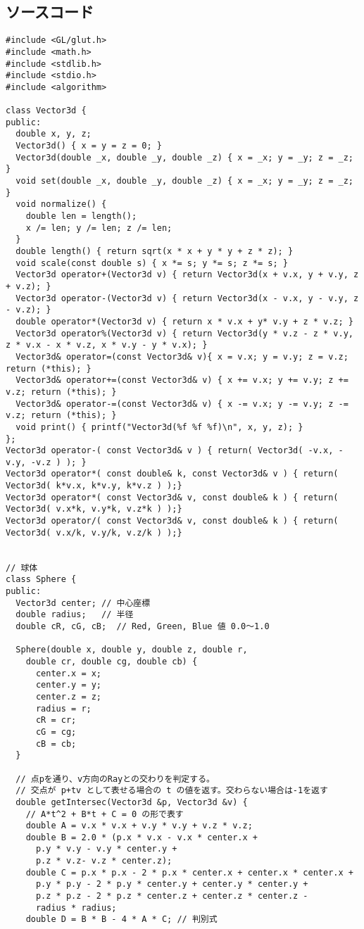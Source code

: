 \documentclass{scrartcl}
\begin{document}
\subsection{ソースコード}
\label{sec:org86d9aa2}
\begin{verbatim}
#include <GL/glut.h>
#include <math.h>
#include <stdlib.h>
#include <stdio.h>
#include <algorithm>

class Vector3d {
public:
  double x, y, z;
  Vector3d() { x = y = z = 0; }
  Vector3d(double _x, double _y, double _z) { x = _x; y = _y; z = _z; }
  void set(double _x, double _y, double _z) { x = _x; y = _y; z = _z; }
  void normalize() {
    double len = length();
    x /= len; y /= len; z /= len;
  }
  double length() { return sqrt(x * x + y * y + z * z); }
  void scale(const double s) { x *= s; y *= s; z *= s; }
  Vector3d operator+(Vector3d v) { return Vector3d(x + v.x, y + v.y, z + v.z); }
  Vector3d operator-(Vector3d v) { return Vector3d(x - v.x, y - v.y, z - v.z); }
  double operator*(Vector3d v) { return x * v.x + y* v.y + z * v.z; }
  Vector3d operator%(Vector3d v) { return Vector3d(y * v.z - z * v.y, z * v.x - x * v.z, x * v.y - y * v.x); }
  Vector3d& operator=(const Vector3d& v){ x = v.x; y = v.y; z = v.z; return (*this); }
  Vector3d& operator+=(const Vector3d& v) { x += v.x; y += v.y; z += v.z; return (*this); }
  Vector3d& operator-=(const Vector3d& v) { x -= v.x; y -= v.y; z -= v.z; return (*this); }
  void print() { printf("Vector3d(%f %f %f)\n", x, y, z); }
};
Vector3d operator-( const Vector3d& v ) { return( Vector3d( -v.x, -v.y, -v.z ) ); }
Vector3d operator*( const double& k, const Vector3d& v ) { return( Vector3d( k*v.x, k*v.y, k*v.z ) );}
Vector3d operator*( const Vector3d& v, const double& k ) { return( Vector3d( v.x*k, v.y*k, v.z*k ) );}
Vector3d operator/( const Vector3d& v, const double& k ) { return( Vector3d( v.x/k, v.y/k, v.z/k ) );}


// 球体
class Sphere {
public:
  Vector3d center; // 中心座標
  double radius;   // 半径
  double cR, cG, cB;  // Red, Green, Blue 値 0.0〜1.0

  Sphere(double x, double y, double z, double r,
    double cr, double cg, double cb) {
      center.x = x;
      center.y = y;
      center.z = z;
      radius = r;
      cR = cr;
      cG = cg;
      cB = cb;
  }

  // 点pを通り、v方向のRayとの交わりを判定する。
  // 交点が p+tv として表せる場合の t の値を返す。交わらない場合は-1を返す
  double getIntersec(Vector3d &p, Vector3d &v) {
    // A*t^2 + B*t + C = 0 の形で表す
    double A = v.x * v.x + v.y * v.y + v.z * v.z;
    double B = 2.0 * (p.x * v.x - v.x * center.x +
      p.y * v.y - v.y * center.y +
      p.z * v.z- v.z * center.z);
    double C = p.x * p.x - 2 * p.x * center.x + center.x * center.x +
      p.y * p.y - 2 * p.y * center.y + center.y * center.y +
      p.z * p.z - 2 * p.z * center.z + center.z * center.z -
      radius * radius;
    double D = B * B - 4 * A * C; // 判別式


\end{verbatim}
\end{document}
